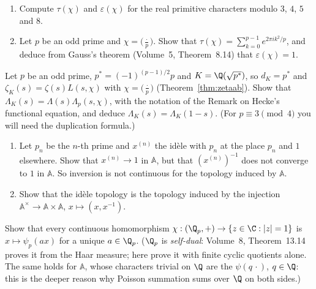 \begin{exercise}[$\star$]\label{ex:rootnumber}
\begin{enumerate}[label=(\alph*)]
\item Compute $\tau(\chi)$ and $\varepsilon(\chi)$ for the real primitive characters modulo $3$, $4$, $5$ and $8$.
\item Let $p$ be an odd prime and $\chi=\bigl(\frac\cdot p\bigr)$. Show that $\tau(\chi)=\sum_{k=0}^{p-1}e^{2\pi ik^2/p}$, and deduce from Gauss's theorem
(Volume~5, Theorem~8.14) that $\varepsilon(\chi)=1$.
\end{enumerate}
\end{exercise}

\begin{exercise}[$\star\star$]\label{ex:hecke}
Let $p$ be an odd prime, $p^*=(-1)^{(p-1)/2}p$ and $K=\Q(\sqrt{p^*})$, so $d_K=p^*$ and $\zeta_K(s)=\zeta(s)L(s,\chi)$ with $\chi=\bigl(\frac\cdot p\bigr)$
(Theorem~\ref{thm:zetaab}). Show that $\Lambda_K(s)=\Lambda(s)\Lambda_p(s,\chi)$, with the notation of the Remark on Hecke's functional equation, and deduce
$\Lambda_K(s)=\Lambda_K(1-s)$. (For $p\equiv3\pmod 4$ you will need the duplication formula.)
\end{exercise}

\begin{exercise}[$\star\star$]\label{ex:ideletop}
\begin{enumerate}[label=(\alph*)]
\item Let $p_n$ be the $n$-th prime and $x^{(n)}$ the id\`ele with $p_n$ at the place $p_n$ and $1$ elsewhere. Show that $x^{(n)}\to1$ in $\mathbb{A}$, but that
$(x^{(n)})^{-1}$ does not converge to $1$ in $\mathbb{A}$. So inversion is not continuous for the topology induced by $\mathbb{A}$.
\item Show that the id\`ele topology is the topology induced by the injection $\mathbb{A}^\times\to\mathbb{A}\times\mathbb{A}$, $x\mapsto(x,x^{-1})$.
\end{enumerate}
\end{exercise}

\begin{exercise}[$\star\star\star$]\label{ex:selfdual}
Show that every continuous homomorphism $\chi:(\Q_p,+)\to\{z\in\C:|z|=1\}$ is $x\mapsto\psi_p(ax)$ for a unique $a\in\Q_p$. ($\Q_p$ is \emph{self-dual}: Volume~8, Theorem~13.14 proves it from the Haar
measure; here prove it with finite cyclic quotients alone. The
same holds for $\mathbb{A}$, whose characters trivial on $\Q$ are the $\psi(q\,\cdot)$, $q\in\Q$: this is the deeper reason why Poisson summation sums over $\Q$
on both sides.)
\end{exercise}

